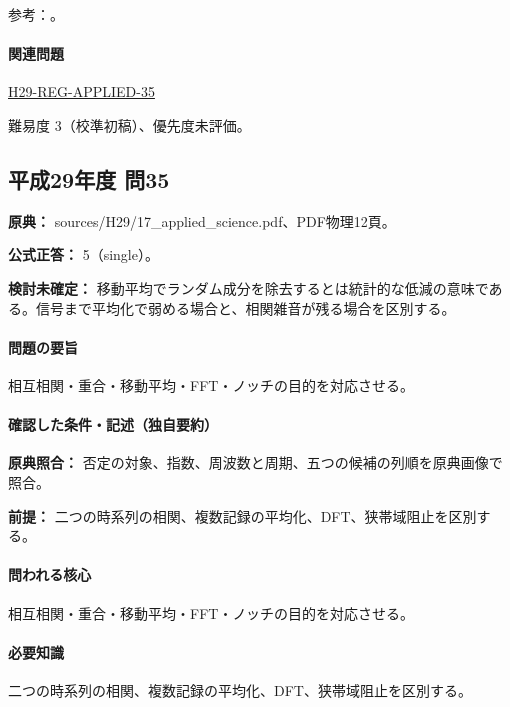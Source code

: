 \par 参考：\cite{mit_signals2010,mit_moving2012,scipy_notch,scipy_fft,usgs_processing2000}。

\paragraph{関連問題} \hyperref[q:h29-reg-applied-35]{H29-REG-APPLIED-35}

\par 難易度 3（校準初稿）、優先度未評価。

\subsection{平成29年度 問35}
\label{q:h29-reg-applied-35}

\noindent\textbf{原典：} sources/H29/17\_applied\_science.pdf、PDF物理12頁。

\textbf{公式正答：} 5（single）。

\par\textbf{検討未確定：} 移動平均でランダム成分を除去するとは統計的な低減の意味である。信号まで平均化で弱める場合と、相関雑音が残る場合を区別する。

\paragraph{問題の要旨} 相互相関・重合・移動平均・FFT・ノッチの目的を対応させる。

\paragraph{確認した条件・記述（独自要約）}\mbox{}\par

\noindent\textbf{原典照合：} 否定の対象、指数、周波数と周期、五つの候補の列順を原典画像で照合。\par

\noindent\textbf{前提：} 二つの時系列の相関、複数記録の平均化、DFT、狭帯域阻止を区別する。\par

\paragraph{問われる核心} 相互相関・重合・移動平均・FFT・ノッチの目的を対応させる。

\paragraph{必要知識} 二つの時系列の相関、複数記録の平均化、DFT、狭帯域阻止を区別する。

